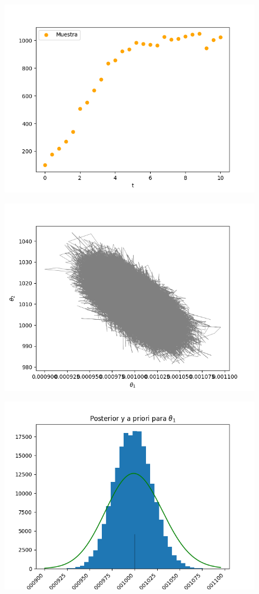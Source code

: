 \begin{figure}[H] 
    \centering 
    \includegraphics[width = 10 cm ]{img/Exp_Central_logistico/Figuras/Generales/Muestra_logistico.png} 
\end{figure} 


\begin{figure}[H] 
    \centering 
    \includegraphics[width = 10 cm ]{img/Exp_Central_logistico/Figuras/Generales/Conjunta_logistico.png} 
\end{figure} 


\begin{figure}[H] 
    \centering 
    \includegraphics[width = 10 cm ]{img/Exp_Central_logistico/Figuras/Generales/Post_theta1_logistico.png} 
\end{figure} 

